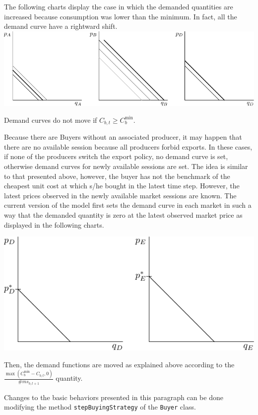\documentclass{article}
\begin{document}
The following charts display the case in which the demanded quantities are increased because consumption was lower than the minimum. In fact, all the demand curve have a rightward shift. 
\vskip5mm
\hskip-1.5cm
\includegraphics{fig_buying_strategy-4.pdf}

\vskip5mm
Demand curves do not move if $C_{b,t}\ge C^{\min}_b$.

Because there are Buyers without an associated producer, it may happen that there are no available session because all producers forbid exports. In these cases, if none of the producers switch the export policy, no demand curve is set, otherwise demand curves for newly available sessions are set. The idea is similar to that presented above, however, the buyer has not the benchmark of the cheapest unit cost at which s/he bought in the latest time step. However, the latest prices observed in the newly available market sessions are known. The current version of the model first sets the demand curve in each market in such a way that the demanded quantity is zero at the latest observed market price as displayed in the following charts. 

\vskip5mm
\hskip-1.5cm
\includegraphics{fig_buying_strategy-5.pdf}

\vskip5mm
Then, the demand functions are moved as explained above according to the $\frac{\max(C^{\min}_b-C_{b,t},0)}{\#ms_{b,t+1}}$ quantity.

Changes to the basic behaviors presented in this paragraph can be done modifying the method \verb+stepBuyingStrategy+ of the \verb+Buyer+ class.
\end{document}
